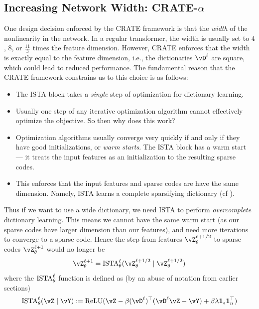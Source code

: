 \documentclass[../../book-main.tex]{subfiles}
\begin{document}
\subsection{Increasing Network Width: CRATE-\texorpdfstring{\(\alpha\)}{alpha}}\label{sub:crate_alpha_experiments}

One design decision enforced by the CRATE framework is that the \textit{width} of the nonlinearity in the network. In a regular transformer, the width is usually set to \(4\), \(8\), or \(\frac{11}{3}\) times the feature dimension. However, CRATE enforces that the width is exactly equal to the feature dimension, i.e., the dictionaries \(\vD^{\ell}\) are square, which could lead to reduced performance. The fundamental reason that the CRATE framework constrains us to this choice is as follows:
\begin{itemize}
    \item The ISTA block takes a \textit{single} step of optimization for dictionary learning.
    \item Usually one step of any iterative optimization algorithm cannot effectively optimize the objective. So then why does this work?
    \item Optimization algorithms usually converge very quickly if and only if they have good initializations, or \textit{warm starts}. The ISTA block has a warm start --- it treats the input features as an initialization to the resulting sparse codes.
    \item This enforces that the input features and sparse codes are have the same dimension. Namely, ISTA learns a complete sparsifying dictionary (cf ).
\end{itemize}
Thus if we want to use a wide dictionary, we need ISTA to perform \textit{overcomplete} dictionary learning. This means we cannot have the same warm start (as our sparse codes have larger dimension than our features), and need more iterations to converge to a sparse code. Hence the step from features \(\vZ_{\theta}^{\ell + 1/2}\) to sparse codes \(\vZ_{\theta}^{\ell + 1}\) would no longer be 
\begin{equation}
    \vZ_{\theta}^{\ell + 1} = \ISTA_{\theta}^{\ell}(\vZ_{\theta}^{\ell + 1/2} \mid \vZ_{\theta}^{\ell + 1/2})
\end{equation}
where the \(\operatorname{ISTA}_{\theta}^{\ell}\) function is defined as (by an abuse of notation from earlier sections)
\begin{equation}
    \ISTA_{\theta}^{\ell}(\vZ \mid \vY) := \ReLU(\vZ - \beta (\vD^{\ell})^{\top}(\vD^{\ell}\vZ - \vY) + \beta \lambda \vone_{s}\vone_{n}^{\top})
\end{equation}
\end{document}
